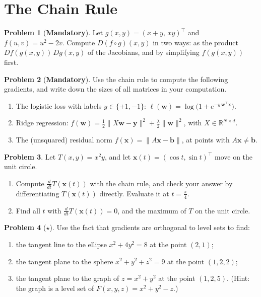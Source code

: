 \documentclass[11pt]{article}
\theoremstyle{definition}
\newtheorem{problem}{Problem}[section]
\newcommand{\mandatory}{\textcolor{red!70!black}{\textbf{Mandatory}}}
\newcommand{\norm}[1]{\lVert #1 \rVert}
\begin{document}
\section{The Chain Rule}

\begin{problem}[\mandatory]\label{pr:chain-compose}
    Let $g(x, y) = (x + y, \, xy)^\top$ and $f(u, v) = u^2 - 2v$. Compute $D(f \circ g)(x, y)$ in two ways: as the product $Df(g(x, y))\,Dg(x, y)$ of the Jacobians, and by simplifying $f(g(x, y))$ first.
\end{problem}

\begin{problem}[\mandatory]\label{pr:loss-gradients}
    Use the chain rule to compute the following gradients, and write down the sizes of all matrices in your computation.
    \begin{enumerate}[label=(\alph*)]
        \item The logistic loss with labels $y \in \{+1, -1\}$: $\ell(\mathbf{w}) = \log\big(1 + e^{-y\,\mathbf{w}^\top\mathbf{x}}\big)$.
        \item Ridge regression: $f(\mathbf{w}) = \frac{1}{2}\norm{X\mathbf{w} - \mathbf{y}}^2 + \frac{\lambda}{2}\norm{\mathbf{w}}^2$, with $X \in \mathbb{R}^{N \times d}$.
        \item The (unsquared) residual norm $f(\mathbf{x}) = \norm{A\mathbf{x} - \mathbf{b}}$, at points with $A\mathbf{x} \neq \mathbf{b}$.
    \end{enumerate}
\end{problem}

\begin{problem}\label{pr:curve-temperature}
    Let $T(x, y) = x^2 y$, and let $\mathbf{x}(t) = (\cos t, \sin t)^\top$ move on the unit circle.
    \begin{enumerate}[label=(\alph*)]
        \item Compute $\frac{d}{dt}T(\mathbf{x}(t))$ with the chain rule, and check your answer by differentiating $T(\mathbf{x}(t))$ directly. Evaluate it at $t = \frac{\pi}{4}$.
        \item Find all $t$ with $\frac{d}{dt}T(\mathbf{x}(t)) = 0$, and the maximum of $T$ on the unit circle.
    \end{enumerate}
\end{problem}

\begin{problem}[$\star$]\label{pr:tangent}
    Use the fact that gradients are orthogonal to level sets to find:
    \begin{enumerate}[label=(\alph*)]
        \item the tangent line to the ellipse $x^2 + 4y^2 = 8$ at the point $(2, 1)$;
        \item the tangent plane to the sphere $x^2 + y^2 + z^2 = 9$ at the point $(1, 2, 2)$;
        \item the tangent plane to the graph of $z = x^2 + y^2$ at the point $(1, 2, 5)$. (Hint: the graph is a level set of $F(x, y, z) = x^2 + y^2 - z$.)
    \end{enumerate}
\end{problem}
\end{document}
